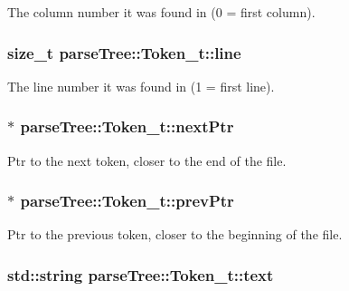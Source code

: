 The column number it was found in (0 = first column). 

\subsubsection[{\texorpdfstring{line}{line}}]{\setlength{\rightskip}{0pt plus 5cm}size\+\_\+t parse\+Tree\+::\+Token\+\_\+t\+::line}\hypertarget{structparse_tree_1_1_token__t_aeb6e84ac89c0e31766abba0a7a48d87e}{}\label{structparse_tree_1_1_token__t_aeb6e84ac89c0e31766abba0a7a48d87e}


The line number it was found in (1 = first line). 

\subsubsection[{\texorpdfstring{next\+Ptr}{nextPtr}}]{$\ast$ parse\+Tree\+::\+Token\+\_\+t\+::next\+Ptr}\hypertarget{structparse_tree_1_1_token__t_a873fefba3212c3c25197fefc85083bf6}{}\label{structparse_tree_1_1_token__t_a873fefba3212c3c25197fefc85083bf6}


Ptr to the next token, closer to the end of the file. 

\subsubsection[{\texorpdfstring{prev\+Ptr}{prevPtr}}]{$\ast$ parse\+Tree\+::\+Token\+\_\+t\+::prev\+Ptr}\hypertarget{structparse_tree_1_1_token__t_a0277c3588dab5bf1a26c0ae60169918d}{}\label{structparse_tree_1_1_token__t_a0277c3588dab5bf1a26c0ae60169918d}


Ptr to the previous token, closer to the beginning of the file. 

\subsubsection[{\texorpdfstring{text}{text}}]{\setlength{\rightskip}{0pt plus 5cm}std\+::string parse\+Tree\+::\+Token\+\_\+t\+::text}\hypertarget{structparse_tree_1_1_token__t_a69704002442dc464b54b106424ddc47d}{}\label{structparse_tree_1_1_token__t_a69704002442dc464b54b106424ddc47d}


